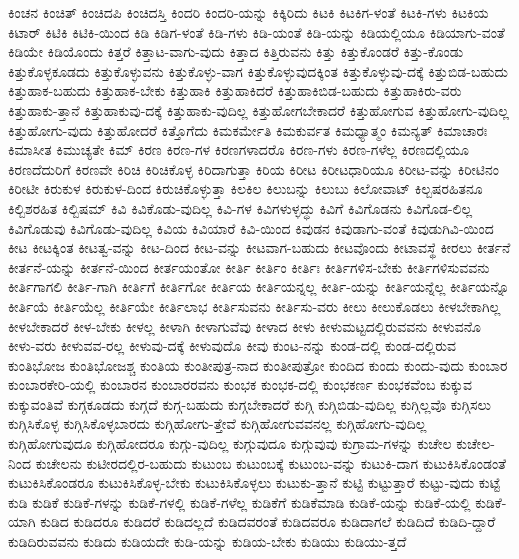 {ಕಿಂಚನ
ಕಿಂಚಿತ್
ಕಿಂಚಿದಪಿ
ಕಿಂಚಿದಸ್ತಿ
ಕಿಂದರಿ
ಕಿಂದರಿ-ಯನ್ನು
ಕಿಕ್ಕಿರಿದು
ಕಿಟಕಿ
ಕಿಟಕಿಗ-ಳಂತೆ
ಕಿಟಕಿ-ಗಳು
ಕಿಟಕಿಯ
ಕಿಟಾರ್
ಕಿಟಿಕಿ
ಕಿಟಿಕಿ-ಯಿಂದ
ಕಿಡಿ
ಕಿಡಿಗ-ಳಂತೆ
ಕಿಡಿ-ಗಳು
ಕಿಡಿ-ಯಂತೆ
ಕಿಡಿ-ಯನ್ನು
ಕಿಡಿಯಲ್ಲಿಯೂ
ಕಿಡಿಯಾಗು-ವಂತೆ
ಕಿಡಿಯೇ
ಕಿಡಿಯೊಂದು
ಕಿತ್ತರೆ
ಕಿತ್ತಾಟ-ವಾಗು-ವುದು
ಕಿತ್ತಾದ
ಕಿತ್ತಿರುವನು
ಕಿತ್ತು
ಕಿತ್ತುಕೊಂಡರೆ
ಕಿತ್ತು-ಕೊಂಡು
ಕಿತ್ತುಕೊಳ್ಳಕೂಡದು
ಕಿತ್ತುಕೊಳ್ಳುವನು
ಕಿತ್ತುಕೊಳ್ಳು-ವಾಗ
ಕಿತ್ತುಕೊಳ್ಳುವುದಕ್ಕಿಂತ
ಕಿತ್ತುಕೊಳ್ಳುವು-ದಕ್ಕೆ
ಕಿತ್ತುಬಿಡ-ಬಹುದು
ಕಿತ್ತುಹಾಕ-ಬಹುದು
ಕಿತ್ತುಹಾಕ-ಬೇಕು
ಕಿತ್ತುಹಾಕಿ
ಕಿತ್ತುಹಾಕಿದರೆ
ಕಿತ್ತುಹಾಕಿಬಿಡ-ಬಹುದು
ಕಿತ್ತುಹಾಕಿರು-ವರು
ಕಿತ್ತುಹಾಕು-ತ್ತಾನೆ
ಕಿತ್ತುಹಾಕುವು-ದಕ್ಕೆ
ಕಿತ್ತುಹಾಕು-ವುದಿಲ್ಲ
ಕಿತ್ತುಹೋಗಬೇಕಾದರೆ
ಕಿತ್ತುಹೋಗುವ
ಕಿತ್ತುಹೋಗು-ವುದಿಲ್ಲ
ಕಿತ್ತುಹೋಗು-ವುದು
ಕಿತ್ತುಹೋದರೆ
ಕಿತ್ತೊಗೆದು
ಕಿಮಕರ್ಮೇತಿ
ಕಿಮಕುರ್ವತ
ಕಿಮಧ್ಯಾತ್ಮಂ
ಕಿಮನ್ಯತ್
ಕಿಮಾಚಾರಃ
ಕಿಮಾಸೀತ
ಕಿಮುಚ್ಯತೇ
ಕಿಮ್
ಕಿರಣ
ಕಿರಣ-ಗಳ
ಕಿರಣಗಳಾದರೊ
ಕಿರಣ-ಗಳು
ಕಿರಣ-ಗಳೆಲ್ಲ
ಕಿರಣದಲ್ಲಿಯೂ
ಕಿರಣದೆದುರಿಗೆ
ಕಿರಣವೇ
ಕಿರಿಚಿ
ಕಿರಿಚಿಕೊಳ್ಳ
ಕಿರಿದಾಗುತ್ತಾ
ಕಿರಿಯ
ಕಿರೀಟ
ಕಿರೀಟಧಾರಿಯೂ
ಕಿರೀಟ-ವನ್ನು
ಕಿರೀಟಿನಂ
ಕಿರೀಟೀ
ಕಿರುಕುಳ
ಕಿರುಕುಳ-ದಿಂದ
ಕಿರುಚಿಕೊಳ್ಳುತ್ತಾ
ಕಿಲಕಿಲ
ಕಿಲುಬನ್ನು
ಕಿಲುಬು
ಕಿಲೋವಾಟ್
ಕಿಲ್ಬಷರಹಿತನೂ
ಕಿಲ್ಬಿಶರಹಿತ
ಕಿಲ್ಬಿಷಮ್
ಕಿವಿ
ಕಿವಿಕೊಡು-ವುದಿಲ್ಲ
ಕಿವಿ-ಗಳ
ಕಿವಿಗಳುಳ್ಳದ್ಧು
ಕಿವಿಗೆ
ಕಿವಿಗೊಡನು
ಕಿವಿಗೊಡ-ಲಿಲ್ಲ
ಕಿವಿಗೊಡುವು
ಕಿವಿಗೊಡು-ವುದಿಲ್ಲ
ಕಿವಿಯ
ಕಿವಿಯಾರೆ
ಕಿವಿ-ಯಿಂದ
ಕಿವುಡನ
ಕಿವುಡಾಗು-ವಂತೆ
ಕಿವುಡುಗಿವಿ-ಯಿಂದ
ಕೀಟ
ಕೀಟಕ್ಕಿಂತ
ಕೀಟತ್ವ-ವನ್ನು
ಕೀಟ-ದಿಂದ
ಕೀಟ-ವನ್ನು
ಕೀಟವಾಗ-ಬಹುದು
ಕೀಟವೊಂದು
ಕೀಟಾವಸ್ಥೆ
ಕೀರಲು
ಕೀರ್ತನೆ
ಕೀರ್ತನೆ-ಯನ್ನು
ಕೀರ್ತನೆ-ಯಿಂದ
ಕೀರ್ತಯಂತೋ
ಕೀರ್ತಿ
ಕೀರ್ತಿಂ
ಕೀರ್ತಿಃ
ಕೀರ್ತಿಗಳಿಸ-ಬೇಕು
ಕೀರ್ತಿಗಳಿಸುವವನು
ಕೀರ್ತಿಗಾಗಲಿ
ಕೀರ್ತಿ-ಗಾಗಿ
ಕೀರ್ತಿಗೆ
ಕೀರ್ತಿಗೋ
ಕೀರ್ತಿಯ
ಕೀರ್ತಿಯನ್ನಲ್ಲ
ಕೀರ್ತಿ-ಯನ್ನು
ಕೀರ್ತಿಯನ್ನೆಲ್ಲ
ಕೀರ್ತಿಯನ್ನೊ
ಕೀರ್ತಿಯೆ
ಕೀರ್ತಿಯೆಲ್ಲ
ಕೀರ್ತಿಯೇ
ಕೀರ್ತಿಲಾಭ
ಕೀರ್ತಿಸುವನು
ಕೀರ್ತಿಸು-ವರು
ಕೀಲು
ಕೀಲುಕೊಡಲು
ಕೀಳಬೇಕಾಗಿಲ್ಲ
ಕೀಳಬೇಕಾದರೆ
ಕೀಳ-ಬೇಕು
ಕೀಳಲ್ಲ
ಕೀಳಾಗಿ
ಕೀಳಾಗುವೆವು
ಕೀಳಾದ
ಕೀಳು
ಕೀಳುಮಟ್ಟದಲ್ಲಿರುವವನು
ಕೀಳುವನೊ
ಕೀಳು-ವರು
ಕೀಳುವವ-ರಲ್ಲ
ಕೀಳುವು-ದಕ್ಕೆ
ಕೀಳುವುದೊ
ಕೀವು
ಕುಂಟ-ನನ್ನು
ಕುಂಡ-ದಲ್ಲಿ
ಕುಂಡ-ದಲ್ಲಿರುವ
ಕುಂತಿಭೋಜ
ಕುಂತಿಭೋಜಶ್ಚ
ಕುಂತಿಯ
ಕುಂತೀಪುತ್ರ-ನಾದ
ಕುಂತೀಪುತ್ರೋ
ಕುಂದಿದ
ಕುಂದು
ಕುಂದು-ವುದು
ಕುಂಬಾರ
ಕುಂಬಾರಕೇರಿ-ಯಲ್ಲಿ
ಕುಂಬಾರನ
ಕುಂಬಾರರವನು
ಕುಂಭಕ
ಕುಂಭಕ-ದಲ್ಲಿ
ಕುಂಭಕರ್ಣ
ಕುಂಭಕವೆಂಬ
ಕುಕ್ಕುವ
ಕುಕ್ಕುವಂತಿವೆ
ಕುಗ್ಗಕೂಡದು
ಕುಗ್ಗದೆ
ಕುಗ್ಗ-ಬಹುದು
ಕುಗ್ಗಬೇಕಾದರೆ
ಕುಗ್ಗಿ
ಕುಗ್ಗಿಬಿಡು-ವುದಿಲ್ಲ
ಕುಗ್ಗಿಲ್ಲವೊ
ಕುಗ್ಗಿಸಲು
ಕುಗ್ಗಿಸಿಕೊಳ್ಳ
ಕುಗ್ಗಿಸಿಕೊಳ್ಳಬಾರದು
ಕುಗ್ಗಿಹೋಗು-ತ್ತೇವೆ
ಕುಗ್ಗಿಹೋಗುವವನಲ್ಲ
ಕುಗ್ಗಿಹೋಗು-ವುದಿಲ್ಲ
ಕುಗ್ಗಿಹೋಗುವುದೂ
ಕುಗ್ಗಿಹೋದರೂ
ಕುಗ್ಗು-ವುದಿಲ್ಲ
ಕುಗ್ಗುವುದೂ
ಕುಗ್ಗುವುವು
ಕುಗ್ರಾಮ-ಗಳನ್ನು
ಕುಚೇಲ
ಕುಚೇಲ-ನಿಂದ
ಕುಚೇಲನು
ಕುಟೀರದಲ್ಲಿರ-ಬಹುದು
ಕುಟುಂಬ
ಕುಟುಂಬಕ್ಕೆ
ಕುಟುಂಬ-ವನ್ನು
ಕುಟುಕಿ-ದಾಗ
ಕುಟುಕಿಸಿಕೊಂಡಂತೆ
ಕುಟುಕಿಸಿಕೊಂಡರೂ
ಕುಟುಕಿಸಿಕೊಳ್ಳ-ಬೇಕು
ಕುಟುಕಿಸಿಕೊಳ್ಳಲು
ಕುಟುಕು-ತ್ತಾನೆ
ಕುಟ್ಟಿ
ಕುಟ್ಟುತ್ತಾರೆ
ಕುಟ್ಟು-ವುದು
ಕುಟ್ಟೆ
ಕುಡಿ
ಕುಡಿಕೆ
ಕುಡಿಕೆ-ಗಳನ್ನು
ಕುಡಿಕೆ-ಗಳಲ್ಲಿ
ಕುಡಿಕೆ-ಗಳೆಲ್ಲ
ಕುಡಿಕೆಗೆ
ಕುಡಿಕೆಮಾಡಿ
ಕುಡಿಕೆ-ಯನ್ನು
ಕುಡಿಕೆ-ಯಲ್ಲಿ
ಕುಡಿಕೆ-ಯಾಗಿ
ಕುಡಿದ
ಕುಡಿದರೂ
ಕುಡಿದರೆ
ಕುಡಿದಲ್ಲದೆ
ಕುಡಿದವರಂತೆ
ಕುಡಿದವರೂ
ಕುಡಿದಾಗಲೆ
ಕುಡಿದಿದೆ
ಕುಡಿದಿ-ದ್ದಾರೆ
ಕುಡಿದಿರುವವನು
ಕುಡಿದು
ಕುಡಿಯದೇ
ಕುಡಿ-ಯನ್ನು
ಕುಡಿಯ-ಬೇಕು
ಕುಡಿಯು
ಕುಡಿಯು-ತ್ತದೆ
}
